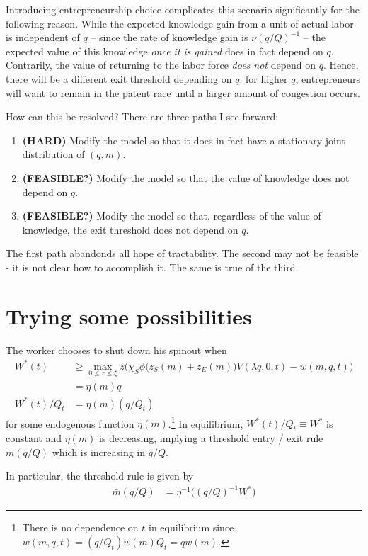 \documentclass[12pt,english]{article}
\theoremstyle{remark}
\begin{document}
Introducing entrepreneurship choice complicates this scenario significantly for the following reason. While the expected knowledge gain from a unit of actual labor is independent of $q$ -- since the rate of knowledge gain is $\nu (q / Q)^{-1}$ -- the expected value of this knowledge \textit{once it is gained} does in fact depend on $q$. Contrarily, the value of returning to the labor force \textit{does not} depend on $q$. Hence, there will be a different exit threshold depending on $q$: for higher $q$, entrepreneurs will want to remain in the patent race until a larger amount of congestion occurs.

How can this be resolved? There are three paths I see forward:

\begin{enumerate}
	\item \textbf{(HARD)} Modify the model so that it does in fact have a stationary joint distribution of $(q,m)$.
	\item \textbf{(FEASIBLE?)} Modify the model so that the value of knowledge does not depend on $q$.
	\item \textbf{(FEASIBLE?)} Modify the model so that, regardless of the value of knowledge, the exit threshold does not depend on $q$. 
\end{enumerate}

The first path abandonds all hope of tractability. The second may not be feasible - it is not clear how to accomplish it. The same is true of the third.

\section{Trying some possibilities}

The worker chooses to shut down his spinout when 
\begin{align*}
	W^*(t) &\ge \max_{0 \le z \le \xi} z \Big(\chi_S  \phi \big( z_S(m) + z_E(m)\big) V(\lambda q,0,t) - w(m,q,t) \Big) \\
	       &= \eta(m) q \\
	W^*(t) / Q_t &= \eta(m) (q / Q_t)
\end{align*}
for some endogenous function $\eta(m)$.\footnote{There is no dependence on $t$ in equilibrium since $w(m,q,t) = (q/Q_t) w(m) Q_t = qw(m)$.} In equilibrium, $W^*(t) / Q_t \equiv W^*$ is constant and $\eta(m)$ is decreasing, implying a threshold entry / exit rule $\bar{m}(q/Q)$ which is increasing in $q/Q$. 

In particular, the threshold rule is given by 
\begin{align*}
	\bar{m}(q/Q) &= \eta^{-1} \big( (q/Q)^{-1} W^* \big) 
\end{align*}
\end{document}
